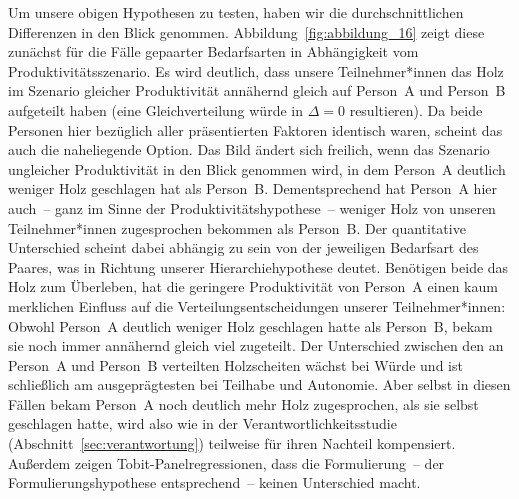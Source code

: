\documentclass[justified,nobib,symmetric,twoside]{tufte-handout}
\begin{document}
Um unsere obigen Hypothesen zu testen, haben wir die durchschnittlichen Differenzen in den Blick genommen.
Abbildung~\ref{fig:abbildung_16} zeigt diese zunächst für die Fälle gepaarter Bedarfsarten in Abhängigkeit vom Produktivitätsszenario.
Es wird deutlich, dass unsere Teilnehmer*innen das Holz im Szenario gleicher Produktivität annähernd gleich auf Person~A und Person~B aufgeteilt haben (eine Gleichverteilung würde in $\Delta = \textrm{0}$ resultieren).
Da beide Personen hier bezüglich aller präsentierten Faktoren identisch waren, scheint das auch die naheliegende Option.
Das Bild ändert sich freilich, wenn das Szenario ungleicher Produktivität in den Blick genommen wird, in dem Person~A deutlich weniger Holz geschlagen hat als Person~B.
Dementsprechend hat Person~A hier auch~-- ganz im Sinne der Produktivitätshypothese~-- weniger Holz von unseren Teilnehmer*innen zugesprochen bekommen als Person~B.
Der quantitative Unterschied scheint dabei abhängig zu sein von der jeweiligen Bedarfsart des Paares, was in Richtung unserer Hierarchiehypothese deutet.
Benötigen beide das Holz zum Überleben, hat die geringere Produktivität von Person~A einen kaum merklichen Einfluss auf die Verteilungsentscheidungen unserer Teilnehmer*innen: Obwohl Person~A deutlich weniger Holz geschlagen hatte als Person~B, bekam sie noch immer annähernd gleich viel zugeteilt.
Der Unterschied zwischen den an Person~A und Person~B verteilten Holzscheiten wächst bei Würde und ist schließlich am ausgeprägtesten bei Teilhabe und Autonomie.
Aber selbst in diesen Fällen bekam Person~A noch deutlich mehr Holz zugesprochen, als sie selbst geschlagen hatte, wird also wie in der Verantwortlichkeitsstudie (Abschnitt~\ref{sec:verantwortung}) teilweise für ihren Nachteil kompensiert.
Außerdem zeigen Tobit-Panelregressionen, dass die Formulierung~-- der Formulierungshypothese entsprechend~-- keinen Unterschied macht.
\end{document}
